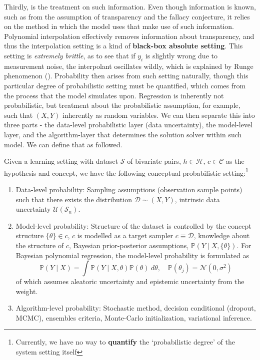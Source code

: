 \documentclass[
  journal=largetwo,
  year=2025,
  volume=37,
]{cup-journal}
\begin{document}
Thirdly, is the treatment on such information. Even though information is known, such as from the assumption of transparency and the fallacy conjecture, it relies on the method in which the model uses that make use of such information. Polynomial interpolation effectively removes information about transparency, and thus the interpolation setting is a kind of \textbf{black-box absolute setting}. This setting is \textit{extremely brittle}, as to see that if $y_{i}$ is slightly wrong due to measurement noise, the interpolant oscillates wildly, which is explained by Runge phenomenon (\cite{Runge1901,CorlessSevyeri2018,AMC2009RungeDivergence}). Probability then arises from such setting naturally, though this particular degree of probabilistic setting must be quantified, which comes from the process that the model simulates upon. Regression is inherently not probabilistic, but treatment about the probabilistic assumption, for example, such that $(X,Y)$ inherently as random variables. We can then separate this into three parts - the data-level probabilistic layer (data uncertainty), the model-level layer, and the algorithm-layer that determines the solution solver within such model. We can define that as followed. 

\begin{conjecture}
    Given a learning setting with dataset $\mathcal{S}$ of bivariate pairs, $h\in \mathcal{H}$, $c\in \mathcal{C}$ as the hypothesis and concept, we have the following conceptual probabilistic setting:\footnote{Currently, we have no way to \textbf{quantify} the `probabilistic degree' of the system setting itself}
    \begin{enumerate}
        \item Data-level probability: Sampling assumptions (observation sample points) such that there exists the distribution $\mathcal{D}\sim (X,Y)$, intrinsic data uncertainty $\mathcal{U}(\mathcal{S}_{n})$. 
        \item Model-level probability: Structure of the dataset is controlled by the concept structure $\{\theta\}\in c$, $c$ is modelled as a target sampler $c\equiv \mathcal{D}$, knowledge about the structure of $c$, Bayesian prior-posterior assumptions, $\mathbb{P}(Y\mid X, \{\theta\})$. For Bayesian polynomial regression, the model-level probability is formulated as \begin{equation}
            \mathbb{P}(Y\mid X) = \int \mathbb{P}(Y\mid X,\theta)\mathbb{P}(\theta)\: d\theta, \quad \mathbb{P}(\theta_{j}) = \mathcal{N}(0,\sigma^{2})
        \end{equation}
        of which assumes aleatoric uncertainty and epistemic uncertainty from the weight. 
        \item Algorithm-level probability: Stochastic method, decision conditional (dropout, MCMC), ensembles criteria, Monte-Carlo initialization, variational inference. 
    \end{enumerate}
\end{conjecture}
\end{document}
